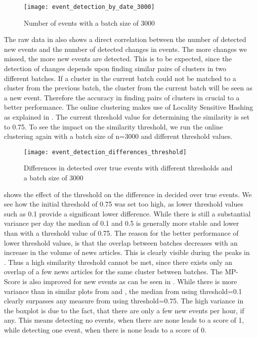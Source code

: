 \begin{figure}[h]
    \centering
    \texttt{[image: event\_detection\_by\_date\_3000]}
    \caption{Number of events with a batch size of 3000}
    \label{fig:event_detection_by_date_3000}
\end{figure}

The raw data in 
also shows a direct correlation between the number of detected new events and the number of detected changes in events.
The more changes we missed, the more new events are detected.
This is to be expected,
since the detection of changes depends upon finding similar pairs of clusters in two different batches.
If a cluster in the current batch could not be matched to a cluster from the previous batch,
the cluster from the current batch will be seen as a new event.
Therefore the accuracy in finding pairs of clusters in crucial to a better performance.
The online clustering makes use of Locality Sensitive Hashing
as explained in .
The current threshold value for determining the similarity is set to 0.75.
To see the impact on the similarity threshold,
we run the online clustering again with a batch size of n=3000 and different threshold values.

\begin{figure}[h]
    \centering
    \texttt{[image: event\_detection\_differences\_threshold]}
    \caption{Differences in detected over true events with different thresholds and a batch size of 3000}
    \label{fig:event_detection_differences_threshold}
\end{figure}

shows the effect of the threshold on the difference in decided over true events.
We see how the initial threshold of 0.75 was set too high,
as lower threshold values such as 0.1 provide a significant lower difference.
While there is still a substantial variance per day the median of 0.1 and 0.5
is generally more stable and lower than with a threshold value of 0.75.
The reason for the better performance of lower threshold values,
is that the overlap between batches decreases with an increase in the volume of news articles.
This is clearly visible during the peaks in .
Thus a high similarity threshold cannot be met,
since there exists only an overlap of a few news articles for the same cluster between batches.
The MP-Score is also improved for new events as can be seen in .
While there is more variance than in similar plots from 
and ,
the median from using threshold=0.1 clearly surpasses any measure from using threshold=0.75.
The high variance in the boxplot is due to the fact, that there are only a few new events per hour, if any.
This means detecting no events, when there are none leads to a score of 1,
while detecting one event, when there is none leads to a score of 0.

